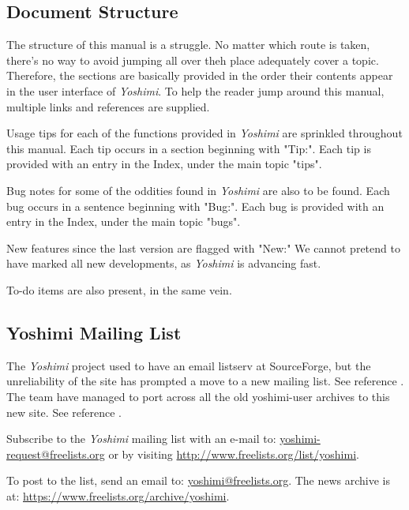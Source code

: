 \documentclass[
 11pt,
 twoside,
 a4paper,
 final                                 %
]{article}
\begin{document}
\subsection{Document Structure}
\label{subsec:introduction_document_structure}

   The structure of this manual is a struggle.  No matter which route is
   taken, there's no way to avoid jumping all over theh place
   adequately cover a topic.  Therefore, the sections are basically provided
   in the order their contents appear in the user interface of
   \textsl{Yoshimi}.  To help the reader jump around this manual, multiple
   links and references are supplied.

   Usage tips
   for each of the functions provided in
   \textsl{Yoshimi} are sprinkled throughout this manual.
   Each tip occurs in a section beginning with "Tip:".
   Each tip is provided with an entry in the Index, under the
   main topic "tips".

   Bug notes for some of the oddities found in \textsl{Yoshimi} are also to be
   found.  Each bug occurs in a sentence beginning with "Bug:".  Each bug is
   provided with an entry in the Index, under the main topic "bugs".

   New features
   since the last version are flagged with "New:"  We cannot pretend to have
   marked all new developments, as \textsl{Yoshimi} is advancing fast.

   To-do items are also present, in the same vein.

\subsection{Yoshimi Mailing List}
\label{subsec:introduction_mailing_list}

   The \textsl{Yoshimi} project used to have an email listserv at
   SourceForge, but the unreliability of the site has prompted a move to a
   new mailing list.  See reference \cite{yoshiminews}.  The team have
   managed to port across all the old yoshimi-user archives to this new
   site.  See reference \cite{yoshiminewsarchive}.

   Subscribe to the \textsl{Yoshimi} mailing list with an e-mail to:
   \url{yoshimi-request@freelists.org} or by visiting 
   \url{http://www.freelists.org/list/yoshimi}.

   To post to the list, send an email to: \url{yoshimi@freelists.org}.
   The news archive is at: \url{https://www.freelists.org/archive/yoshimi}.
\end{document}
